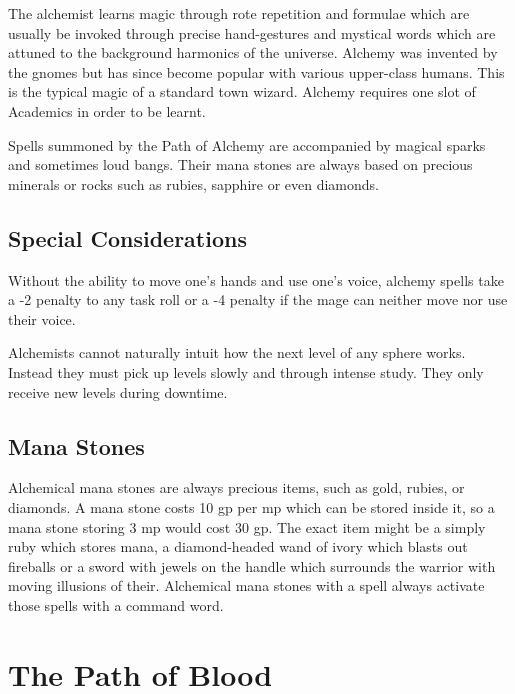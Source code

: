 \begin{multicols}{2}

\noindent The alchemist learns magic through rote repetition and formulae which are usually be invoked through precise hand-gestures and mystical words which are attuned to the background harmonics of the universe.  Alchemy was invented by the gnomes but has since become popular with various upper-class humans. This is the typical magic of a standard town wizard. Alchemy requires one slot of Academics in order to be learnt.

Spells summoned by the Path of Alchemy are accompanied by magical sparks and sometimes loud bangs. Their mana stones are always based on precious minerals or rocks such as rubies, sapphire or even diamonds. 

\subsection{Special Considerations}

Without the ability to move one's hands and use one's voice, alchemy spells take a -2 penalty to any task roll or a -4 penalty if the mage can neither move nor use their voice.

Alchemists cannot naturally intuit how the next level of any sphere works.
Instead they must pick up levels slowly and through intense study.
They only receive new levels during \gls{downtime}.

\subsection{Mana Stones}

Alchemical mana stones are always precious items, such as gold, rubies, or diamonds.  A mana stone costs 10 gp per \gls{mp} which can be stored inside it, so a mana stone storing 3 \gls{mp} would cost 30 gp. The exact item might be a simply ruby which stores mana, a diamond-headed wand of ivory which blasts out fireballs or a sword with jewels on the handle which surrounds the warrior with moving illusions of their. Alchemical mana stones with a spell always activate those spells with a command word.

\end{multicols}

\section{The Path of Blood}

